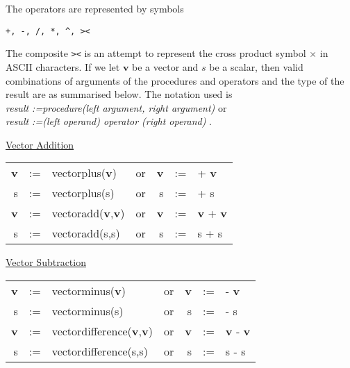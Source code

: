 The operators are represented by symbols
\hypertarget{reserved:vectorcross}{}
\begin{verbatim}
+, -, /, *, ^, ><
\end{verbatim}
The composite \texttt{><} is an
attempt to represent the cross product symbol
$\times$ in ASCII characters.
If we let $\mathbf{v}$ be a vector and $s$ be a scalar, then
valid combinations of arguments of the
procedures and operators and the type of the result
are as summarised below.  The notation used is\\
\emph{result :=procedure(left argument, right argument) } or\\
\emph{result :=(left operand) operator (right operand) } .

\underline{Vector Addition} \\
  
\begin{tabular}{rclcrcl}
\textbf{v} &:=& vectorplus(\textbf{v})  &\textrm{or}& \textbf{v} &:=&  +  \textbf{v} \\
     s  &:=& vectorplus(s)  &\textrm{or} &      s  &:=&  +       s  \\
\textbf{v} &:=& vectoradd(\textbf{v},\textbf{v})  &\textrm{or }& \textbf{v} &:=&
\textbf{v} +  \textbf{v} \\
     s  &:=& vectoradd(s,s)  &\textrm{or }&      s  &:=&  s + s \\
\end{tabular}

\underline{Vector Subtraction} \\
  
\begin{tabular}{rclcrcl}
\textbf{v} &:=& vectorminus(\textbf{v})  &\textrm{or}&
 \textbf{v} &:=&  -  \textbf{v} \\
 s  &:=& vectorminus(s)  &\textrm{or} &      s  &:=&  -       s  \\
\textbf{v} &:=& vectordifference(\textbf{v},\textbf{v})  &\textrm{or }& \textbf{v} &:=&
  \textbf{v} -  \textbf{v} \\
 s  &:=& vectordifference(s,s)  &\textrm{or }&      s  &:=&  s - s \\
\end{tabular}

